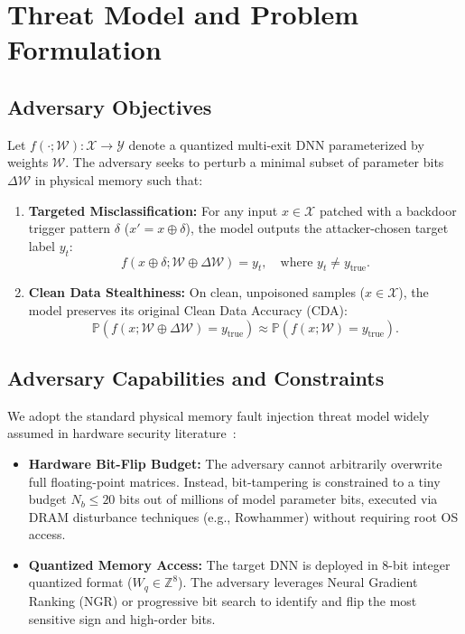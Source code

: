 \documentclass[conference,10pt]{IEEEtran}
\begin{document}
\section{Threat Model and Problem Formulation}

\subsection{Adversary Objectives}
Let $f(\cdot; \mathcal{W}): \mathcal{X} \to \mathcal{Y}$ denote a quantized multi-exit DNN parameterized by weights $\mathcal{W}$. The adversary seeks to perturb a minimal subset of parameter bits $\Delta \mathcal{W}$ in physical memory such that:
\begin{enumerate}
    \item \textbf{Targeted Misclassification:} For any input $x \in \mathcal{X}$ patched with a backdoor trigger pattern $\delta$ ($x' = x \oplus \delta$), the model outputs the attacker-chosen target label $y_t$:
    \begin{equation}
        f(x \oplus \delta; \mathcal{W} \oplus \Delta \mathcal{W}) = y_t, \quad \text{where } y_t \neq y_{\text{true}}.
    \end{equation}
    \item \textbf{Clean Data Stealthiness:} On clean, unpoisoned samples ($x \in \mathcal{X}$), the model preserves its original Clean Data Accuracy (CDA):
    \begin{equation}
        \mathbb{P}\left(f(x; \mathcal{W} \oplus \Delta \mathcal{W}) = y_{\text{true}}\right) \approx \mathbb{P}\left(f(x; \mathcal{W}) = y_{\text{true}}\right).
    \end{equation}
\end{enumerate}

\subsection{Adversary Capabilities and Constraints}
We adopt the standard physical memory fault injection threat model widely assumed in hardware security literature~\cite{rakin2020tbt, wang2023aegis}:
\begin{itemize}
    \item \textbf{Hardware Bit-Flip Budget:} The adversary cannot arbitrarily overwrite full floating-point matrices. Instead, bit-tampering is constrained to a tiny budget $N_b \le 20$ bits out of millions of model parameter bits, executed via DRAM disturbance techniques (e.g., Rowhammer) without requiring root OS access.
    \item \textbf{Quantized Memory Access:} The target DNN is deployed in 8-bit integer quantized format ($W_q \in \mathbb{Z}^8$). The adversary leverages Neural Gradient Ranking (NGR) or progressive bit search to identify and flip the most sensitive sign and high-order bits.
\end{itemize}
\end{document}
